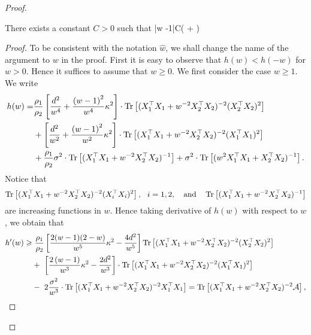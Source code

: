 \begin{proof}
\begin{claim}\label{lem_hat_v}
There exists a constant $C>0$ such that
	\be\label{hatw_add1}|\hat w -1|\le C\left( + \right)\quad {}\ee
\end{claim}
\begin{proof}
To be consistent with the notation $\hat w$, we shall change the name of the argument to $w$ in the proof. First it is easy to observe that $h(w)< h(-w)$ for $w> 0$. Hence it suffices to assume that $w\ge 0$. We first consider the case $w\ge 1$. We write
\begin{align}
	h(w) =&  \frac{\rho_1}{\rho_2}\left[\frac{d^2}{w^4} +\frac{\left( w-1\right)^2}{w^4}\kappa^2\right]\cdot \tr\left[( X_1^{\top}X_1 +w^{-2}X_2^{\top}X_2)^{-2} (X_2^{\top}X_2)^2\right] \nonumber \\
	& + \left[\frac{d^2}{w^2} +\frac{\left( w-1\right)^2}{w^2}\kappa^2\right]\cdot \tr\left[( X_1^{\top}X_1 +w^{-2}X_2^{\top}X_2)^{-2} (X_1^{\top}X_1)^2\right] \nonumber\\
			& +  \frac{\rho_1}{\rho_2}\sigma^2  \cdot \bigtr{(X_1^{\top}X_1  + w^{-2}X_2^{\top}X_2)^{-1} }+ \sigma^2 \cdot \bigtr{(w^2X_1^{\top}X_1  + X_2^{\top}X_2)^{-1} }.\nonumber%
\end{align}
Notice that
$$\operatorname{Tr}\left[( X_1^{\top}X_1 +w^{-2}X_2^{\top}X_2)^{-2} (X_i^{\top}X_i)^2\right],\ \ i=1,2, \quad \text{and} \quad \operatorname{Tr}\left[(X_1^{\top}X_1  + w^{-2}X_2^{\top}X_2)^{-1} \right]$$
are increasing functions in $w$. Hence taking derivative of $h(w)$ with respect to $w$, we obtain that
\begin{align*}
h'(w) \geqslant &~  \frac{\rho_1}{\rho_2}\left[ \frac{2(w-1)(2-w)}{w^5}\kappa^2 - \frac{4d^2}{w^5}\right] \operatorname{Tr}\left[( X_1^{\top}X_1 +w^{-2}X_2^{\top}X_2)^{-2} (X_2^{\top}X_2)^2\right]   \\
 &+~ \left[\frac{2\left( w-1\right)}{w^3}\kappa^2 - \frac{2d^2}{w^3} \right]\cdot \operatorname{Tr}\left[( X_1^{\top}X_1 +w^{-2}X_2^{\top}X_2)^{-2} (X_1^{\top}X_1)^2\right] \nonumber\\
		&-~ 2  \frac{\sigma^2}{w^3} \cdot \operatorname{Tr}\left[(X_1^{\top}X_1 + w^{-2}X_2^{\top}X_2)^{-2} X_1^\top X_1  \right] =  \operatorname{Tr}\left[(X_1^{\top}X_1 + w^{-2}X_2^{\top}X_2)^{-2} \mathcal A \right],
\end{align*}

\end{proof}
\end{proof}
